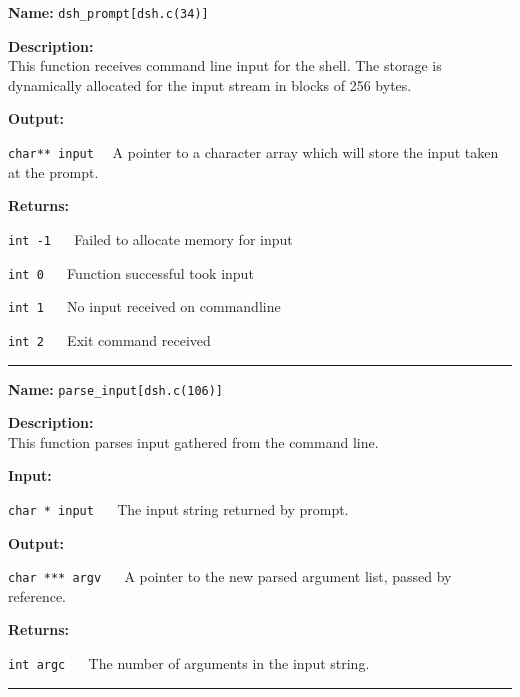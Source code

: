 \documentclass[11pt,a4paper]{article}
\begin{document}

\begin{description}
\item \textbf{Name:} 
\verb|dsh_prompt[dsh.c(34)]|

\item \textbf{Description:}\\
This function receives command line input for the shell.
The storage is dynamically allocated for the input stream in
blocks of 256 bytes.

\item \textbf{Output:}
\begin{description}
\item \verb|char** input|~~ A pointer to a character array which will store the input taken at the prompt.
\end{description}

\item \textbf{Returns:}
\begin{description}
\item \verb|int -1| ~~ Failed to allocate memory for input
\item \verb|int 0| ~~ Function successful took input
\item \verb|int 1| ~~ No input received on commandline
\item \verb|int 2| ~~ Exit command received
\end{description}
\end{description}\hrule

\begin{description}
\item \textbf{Name:} 
\verb|parse_input[dsh.c(106)]|

\item \textbf{Description:}\\
This function parses input gathered from the command line.

\item \textbf{Input:}
\begin{description}
\item \verb|char * input| ~~ The input string returned by prompt.
\end{description}

\item \textbf{Output:}
\begin{description}
\item \verb|char *** argv| ~~ A pointer to the new parsed argument list, passed by reference.
\end{description}

\item \textbf{Returns:}
\begin{description}
\item \verb|int argc| ~~ The number of arguments in the input string.
\end{description}
\end{description}\hrule
\end{document}
